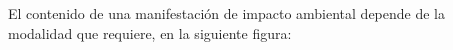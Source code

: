 El contenido de una manifestación de impacto ambiental depende de la modalidad que requiere, en la siguiente figura:
